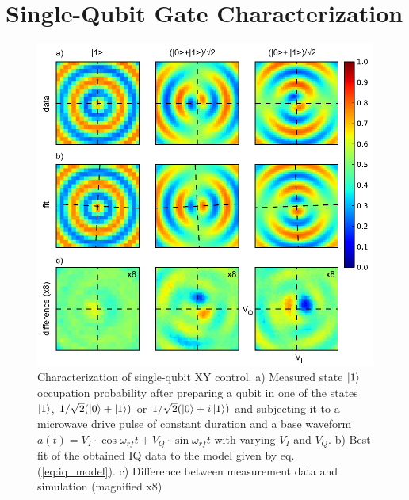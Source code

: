\section{Single-Qubit Gate Characterization}

\begin{figure}[ht!]
	\centering
		\includegraphics[width=\textwidth]{"./data/ct5/2010_12_01 - iq tomography/iq_tomography_analysis"}
	\caption{Characterization of single-qubit XY control. a) Measured state $\left| 1 \right>$ occupation probability after preparing a qubit in one of the states $\left| 1 \right>$, $1/\sqrt{2}(\left| 0 \right>+\left| 1 \right>)$ or $1/\sqrt{2}(\left| 0 \right>+i\left| 1 \right>)$ and subjecting it to a microwave drive pulse of constant duration and a base waveform $a(t) = V_I\cdot\cos{\omega_{rf}t}+V_Q\cdot\sin{\omega_{rf}t}$ with varying $V_I$ and $V_Q$. b) Best fit of the obtained IQ data to the model given by eq. (\ref{eq:iq_model}). c) Difference between measurement data and simulation (magnified x8)}
	\label{fig:single_qubit_iq_control}
\end{figure}


